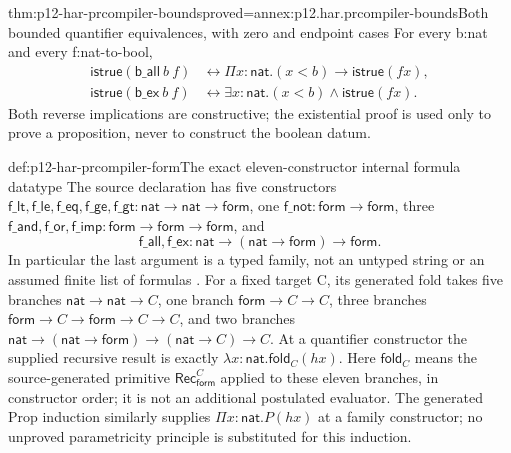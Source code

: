 \begin{hbtheorem}{thm:p12-har-prcompiler-bounds}{proved=annex:p12.har.prcompiler-bounds}{Both bounded quantifier equivalences, with zero and endpoint cases}
For every b:nat and every f:nat-to-bool,
\[
\begin{aligned}
 \mathsf{istrue}(\mathsf{b\_all}\ b\ f)&\leftrightarrow
                 \Pi x:\mathsf{nat}.(x<b)\to\mathsf{istrue}(f x),\\
 \mathsf{istrue}(\mathsf{b\_ex}\ b\ f)&\leftrightarrow
                 \exists x:\mathsf{nat}.(x<b)\wedge\mathsf{istrue}(f x).
\end{aligned}
\]
Both reverse implications are constructive; the existential proof is
used only to prove a proposition, never to construct the boolean datum.
\end{hbtheorem}

\begin{hbdefinition}{def:p12-har-prcompiler-form}{The exact eleven-constructor internal formula datatype}
The source declaration has five constructors
\(\mathsf{f\_lt},\mathsf{f\_le},\mathsf{f\_eq},\mathsf{f\_ge},\mathsf{f\_gt}:
\mathsf{nat}\to\mathsf{nat}\to\mathsf{form}\),
one \(\mathsf{f\_not}:\mathsf{form}\to\mathsf{form}\),
three \(\mathsf{f\_and},\mathsf{f\_or},\mathsf{f\_imp}:
\mathsf{form}\to\mathsf{form}\to\mathsf{form}\), and
\[
 \mathsf{f\_all},\mathsf{f\_ex}:
        \mathsf{nat}\to(\mathsf{nat}\to\mathsf{form})\to\mathsf{form}.
\]
In particular the last argument is a typed family, not an untyped string
or an assumed finite list of formulas
\cite[Definition~7 and generated induction, pp.~18--19]{OostdijkGeuvers2000ProofByComputationPreprint}.
For a fixed target C, its generated fold takes five branches
\(\mathsf{nat}\to\mathsf{nat}\to C\), one branch
\(\mathsf{form}\to C\to C\), three branches
\(\mathsf{form}\to C\to\mathsf{form}\to C\to C\), and two branches
\(\mathsf{nat}\to(\mathsf{nat}\to\mathsf{form})\to
(\mathsf{nat}\to C)\to C\).
At a quantifier constructor the supplied recursive result is exactly
\(\lambda x:\mathsf{nat}.\mathsf{fold}_C(h x)\).
Here \(\mathsf{fold}_C\) means the source-generated primitive
\(\mathsf{Rec}_{\mathsf{form}}^C\) applied to these eleven branches,
in constructor order; it is not an additional postulated evaluator.
The generated Prop induction similarly supplies
\(\Pi x:\mathsf{nat}.P(h x)\) at a family constructor; no unproved
parametricity principle is substituted for this induction.
\end{hbdefinition}

